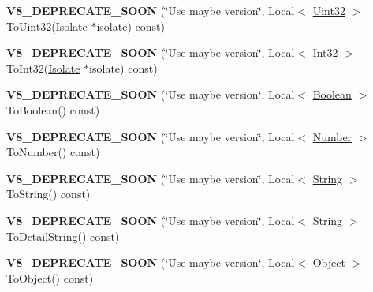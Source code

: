 \begin{DoxyCompactItemize}
\item 
\hypertarget{classv8_1_1Value_a7bf28af92f41657ef0fc4bdc015a124f}{}{\bfseries V8\+\_\+\+D\+E\+P\+R\+E\+C\+A\+T\+E\+\_\+\+S\+O\+O\+N} (\char`\"{}Use maybe version\char`\"{}, Local$<$ \hyperlink{classv8_1_1Uint32}{Uint32} $>$ To\+Uint32(\hyperlink{classv8_1_1Isolate}{Isolate} $\ast$isolate) const)\label{classv8_1_1Value_a7bf28af92f41657ef0fc4bdc015a124f}

\item 
\hypertarget{classv8_1_1Value_abf72660ee84f81fe2fed85e39e6a3c86}{}{\bfseries V8\+\_\+\+D\+E\+P\+R\+E\+C\+A\+T\+E\+\_\+\+S\+O\+O\+N} (\char`\"{}Use maybe version\char`\"{}, Local$<$ \hyperlink{classv8_1_1Int32}{Int32} $>$ To\+Int32(\hyperlink{classv8_1_1Isolate}{Isolate} $\ast$isolate) const)\label{classv8_1_1Value_abf72660ee84f81fe2fed85e39e6a3c86}

\item 
\hypertarget{classv8_1_1Value_a4c9960d9a42b62b83d70ade47d88fa52}{}{\bfseries V8\+\_\+\+D\+E\+P\+R\+E\+C\+A\+T\+E\+\_\+\+S\+O\+O\+N} (\char`\"{}Use maybe version\char`\"{}, Local$<$ \hyperlink{classv8_1_1Boolean}{Boolean} $>$ To\+Boolean() const)\label{classv8_1_1Value_a4c9960d9a42b62b83d70ade47d88fa52}

\item 
\hypertarget{classv8_1_1Value_a3569dca21e27c889a4f4e343292e5ffc}{}{\bfseries V8\+\_\+\+D\+E\+P\+R\+E\+C\+A\+T\+E\+\_\+\+S\+O\+O\+N} (\char`\"{}Use maybe version\char`\"{}, Local$<$ \hyperlink{classv8_1_1Number}{Number} $>$ To\+Number() const)\label{classv8_1_1Value_a3569dca21e27c889a4f4e343292e5ffc}

\item 
\hypertarget{classv8_1_1Value_a4d1fe1c6d7ba6cccef24fc3fe528d75a}{}{\bfseries V8\+\_\+\+D\+E\+P\+R\+E\+C\+A\+T\+E\+\_\+\+S\+O\+O\+N} (\char`\"{}Use maybe version\char`\"{}, Local$<$ \hyperlink{classv8_1_1String}{String} $>$ To\+String() const)\label{classv8_1_1Value_a4d1fe1c6d7ba6cccef24fc3fe528d75a}

\item 
\hypertarget{classv8_1_1Value_af8a9f3532d549640ad69037214d51305}{}{\bfseries V8\+\_\+\+D\+E\+P\+R\+E\+C\+A\+T\+E\+\_\+\+S\+O\+O\+N} (\char`\"{}Use maybe version\char`\"{}, Local$<$ \hyperlink{classv8_1_1String}{String} $>$ To\+Detail\+String() const)\label{classv8_1_1Value_af8a9f3532d549640ad69037214d51305}

\item 
\hypertarget{classv8_1_1Value_a594821f24e204aa6a7b1f003a79089a5}{}{\bfseries V8\+\_\+\+D\+E\+P\+R\+E\+C\+A\+T\+E\+\_\+\+S\+O\+O\+N} (\char`\"{}Use maybe version\char`\"{}, Local$<$ \hyperlink{classv8_1_1Object}{Object} $>$ To\+Object() const)\label{classv8_1_1Value_a594821f24e204aa6a7b1f003a79089a5}


\end{DoxyCompactItemize}
